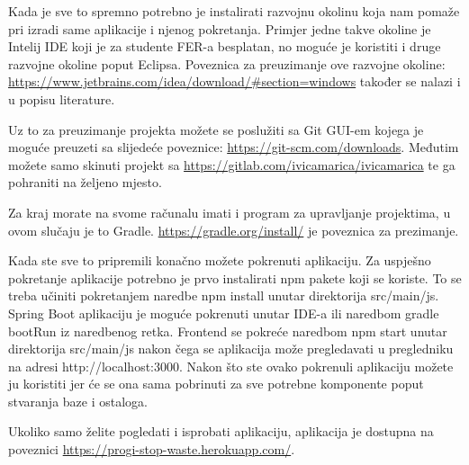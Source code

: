 		Kada je sve to spremno potrebno je instalirati razvojnu okolinu koja nam pomaže pri izradi same aplikacije i njenog pokretanja. Primjer jedne takve okoline je Intelij IDE koji je za studente FER-a besplatan, no moguće je koristiti i druge razvojne okoline poput Eclipsa. Poveznica za preuzimanje ove razvojne okoline:  \url{https://www.jetbrains.com/idea/download/#section=windows}  također se nalazi i u popisu literature.
		
		Uz to za preuzimanje projekta možete se poslužiti sa Git GUI-em kojega je moguće preuzeti sa slijedeće poveznice: \url{https://git-scm.com/downloads}. Međutim možete samo skinuti projekt sa \url{https://gitlab.com/ivicamarica/ivicamarica} te ga pohraniti na željeno mjesto.
		
		Za kraj morate na svome računalu imati i program za upravljanje projektima, u ovom slučaju je to Gradle. \url{https://gradle.org/install/} je poveznica za prezimanje.
		
		Kada ste sve to pripremili konačno možete pokrenuti aplikaciju. Za uspješno pokretanje aplikacije potrebno je prvo instalirati npm pakete koji se koriste. To se treba učiniti pokretanjem naredbe
		npm install unutar direktorija src/main/js.
		Spring Boot aplikaciju je moguće pokrenuti unutar IDE-a ili naredbom gradle bootRun iz naredbenog retka.
		Frontend se pokreće naredbom npm start unutar direktorija src/main/js nakon čega se aplikacija može pregledavati u pregledniku na adresi http://localhost:3000.
		Nakon što ste ovako pokrenuli aplikaciju možete ju koristiti jer će se ona sama pobrinuti za sve potrebne komponente poput stvaranja baze i ostaloga.
		
		Ukoliko samo želite pogledati i isprobati aplikaciju, aplikacija je dostupna na poveznici  \url{https://progi-stop-waste.herokuapp.com/}.
		
		
		
		
			 
			
			\eject 